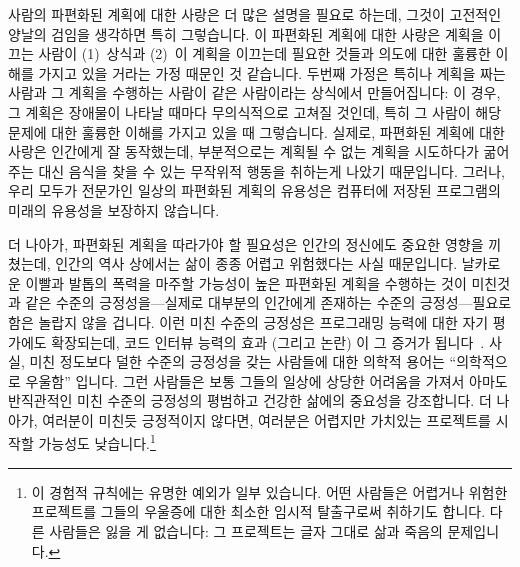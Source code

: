 사람의 파편화된 계획에 대한 사랑은 더 많은 설명을 필요로 하는데, 그것이
고전적인 양날의 검임을 생각하면 특히 그렇습니다.
이 파편화된 계획에 대한 사랑은 계획을 이끄는 사람이 (1)~상식과 (2)~이 계획을
이끄는데 필요한 것들과 의도에 대한 훌륭한 이해를 가지고 있을 거라는 가정 때문인
것 같습니다.
두번째 가정은 특히나 계획을 짜는 사람과 그 계획을 수행하는 사람이 같은
사람이라는 상식에서 만들어집니다:  이 경우, 그 계획은 장애물이 나타날 때마다
무의식적으로 고쳐질 것인데, 특히 그 사람이 해당 문제에 대한 훌륭한 이해를
가지고 있을 때 그렇습니다.
실제로, 파편화된 계획에 대한 사랑은 인간에게 잘 동작했는데, 부분적으로는 계획될
수 없는 계획을 시도하다가 굶어주는 대신 음식을 찾을 수 있는 무작위적 행동을
취하는게 나았기 때문입니다.
그러나, 우리 모두가 전문가인 일상의 파편화된 계획의 유용성은 컴퓨터에 저장된
프로그램의 미래의 유용성을 보장하지 않습니다.

더 나아가, 파편화된 계획을 따라가야 할 필요성은 인간의 정신에도 중요한 영향을
끼쳤는데, 인간의 역사 상에서는 삶이 종종 어렵고 위험했다는 사실 때문입니다.
날카로운 이빨과 발톱의 폭력을 마주할 가능성이 높은 파편화된 계획을 수행하는
것이 미친것과 같은 수준의 긍정성을---실제로 대부분의 인간에게 존재하는 수준의
긍정성---필요로 함은 놀랍지 않을 겁니다.
이런 미친 수준의 긍정성은 프로그래밍 능력에 대한 자기 평가에도 확장되는데, 코드
인터뷰 능력의 효과 (그리고 논란) 이 그 증거가
됩니다~\cite{RegBraithwaite2007FizzBuzz}.
사실, 미친 정도보다 덜한 수준의 긍정성을 갖는 사람들에 대한 의학적 용어는
``의학적으로 우울함'' 입니다.
그런 사람들은 보통 그들의 일상에 상당한 어려움을 가져서 아마도 반직관적인 미친
수준의 긍정성의 평범하고 건강한 삶에의 중요성을 강조합니다.
더 나아가, 여러분이 미친듯 긍정적이지 않다면, 여러분은 어렵지만 가치있는
프로젝트를 시작할 가능성도 낮습니다.\footnote{
	이 경험적 규칙에는 유명한 예외가 일부 있습니다.
	어떤 사람들은 어렵거나 위험한 프로젝트를 그들의 우울증에 대한 최소한
	임시적 탈출구로써 취하기도 합니다.
	다른 사람들은 잃을 게 없습니다: 그 프로젝트는 글자 그대로 삶과 죽음의
	문제입니다.}

